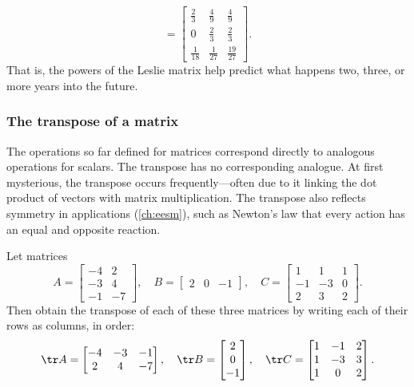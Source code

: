 \begin{example}
\begin{equation*}
=\begin{bmatrix} \frac23&\frac49&\frac49\\ 0&\frac23&\frac23\\  \frac1{18}&\frac1{27}&\frac{19}{27}\end{bmatrix}.
\end{equation*}
That is, the powers of the Leslie matrix help predict what happens two, three, or more years into the future.
\end{example}






\subsubsection{The transpose of a matrix}


The operations so far defined for matrices correspond directly to analogous operations for scalars.
The transpose has no corresponding analogue.
At first mysterious, the transpose occurs frequently---often due to it linking the dot product of vectors with matrix multiplication.
The transpose also reflects symmetry in applications (\autoref{ch:eesm}), such as Newton's law that every action has an equal and opposite reaction.

\begin{example} \label{eg:mattrans}
Let matrices
\begin{equation*}
A=\begin{bmatrix} -4 & 2\\ -3 & 4\\ -1 & -7 \end{bmatrix},\quad
B=\begin{bmatrix} 2 & 0 & -1 \end{bmatrix},\quad
C=\begin{bmatrix} 1 & 1 & 1\\ -1 & -3 & 0\\ 2 & 3 & 2 \end{bmatrix}.
\end{equation*}
Then obtain the transpose of each of these three matrices by writing each of their rows as columns, in order:
\begin{equation*}
\tr A=\begin{bmatrix} -4 & -3 & -1\\ 2 & 4 & -7 \end{bmatrix},\quad
\tr B=\begin{bmatrix} 2\\ 0\\ -1 \end{bmatrix},\quad
\tr C=\begin{bmatrix} 1 & -1 & 2\\ 1 & -3 & 3\\ 1 & 0 & 2 \end{bmatrix}.
\end{equation*}
\end{example}

